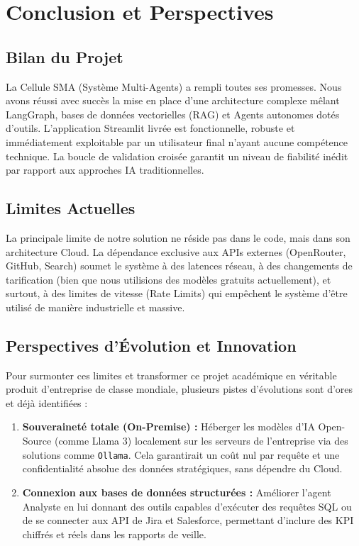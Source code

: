 \documentclass[12pt,a4paper]{report}
\begin{document}
\chapter{Conclusion et Perspectives}

\section{Bilan du Projet}
La Cellule SMA (Système Multi-Agents) a rempli toutes ses promesses. Nous avons réussi avec succès la mise en place d'une architecture complexe mêlant LangGraph, bases de données vectorielles (RAG) et Agents autonomes dotés d'outils. L'application Streamlit livrée est fonctionnelle, robuste et immédiatement exploitable par un utilisateur final n'ayant aucune compétence technique. La boucle de validation croisée garantit un niveau de fiabilité inédit par rapport aux approches IA traditionnelles.

\section{Limites Actuelles}
La principale limite de notre solution ne réside pas dans le code, mais dans son architecture Cloud. La dépendance exclusive aux APIs externes (OpenRouter, GitHub, Search) soumet le système à des latences réseau, à des changements de tarification (bien que nous utilisions des modèles gratuits actuellement), et surtout, à des limites de vitesse (Rate Limits) qui empêchent le système d'être utilisé de manière industrielle et massive.

\section{Perspectives d'Évolution et Innovation}
Pour surmonter ces limites et transformer ce projet académique en véritable produit d'entreprise de classe mondiale, plusieurs pistes d'évolutions sont d'ores et déjà identifiées :
\begin{enumerate}
    \item \textbf{Souveraineté totale (On-Premise) :} Héberger les modèles d'IA Open-Source (comme Llama 3) localement sur les serveurs de l'entreprise via des solutions comme \texttt{Ollama}. Cela garantirait un coût nul par requête et une confidentialité absolue des données stratégiques, sans dépendre du Cloud.
    \item \textbf{Connexion aux bases de données structurées :} Améliorer l'agent Analyste en lui donnant des outils capables d'exécuter des requêtes SQL ou de se connecter aux API de Jira et Salesforce, permettant d'inclure des KPI chiffrés et réels dans les rapports de veille.
\end{enumerate}
\end{document}

